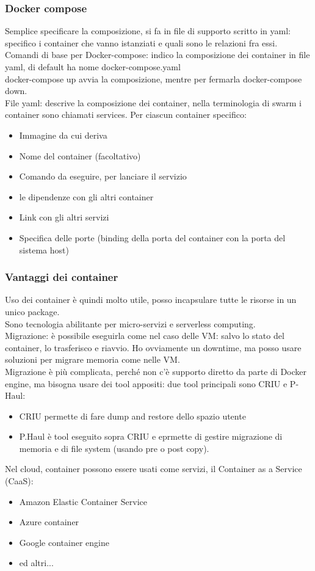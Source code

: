 \documentclass[16px]{article}
\begin{document}
\subsubsection{Docker compose}
Semplice specificare la composizione, si fa in file di supporto scritto in yaml: specifico i container che vanno istanziati e quali sono le relazioni fra essi.\\  
Comandi di base per Docker-compose: indico la composizione dei container in file yaml, di default ha nome docker-compose.yaml\\ docker-compose up avvia la composizione, mentre per fermarla docker-compose down.\\ File yaml: descrive la composizione dei container, nella terminologia di swarm i container sono chiamati services. Per ciascun container specifico:
\begin{itemize}
\item Immagine da cui deriva
\item Nome del container (facoltativo)
\item Comando da eseguire, per lanciare il servizio
\item le dipendenze con gli altri container
\item Link con gli altri servizi
\item Specifica delle porte (binding della porta del container con la porta del sistema host)
\end{itemize}
\subsubsection{Vantaggi dei container}
Uso dei container è quindi molto utile, posso incapsulare tutte le risorse in un unico package.\\ Sono tecnologia abilitante per micro-servizi e serverless computing.\\
Migrazione: è possibile eseguirla come nel caso delle VM: salvo lo stato del container, lo trasferisco e riavvio. Ho ovviamente un downtime, ma posso usare soluzioni per migrare memoria come nelle VM.\\ Migrazione è più complicata, perché non c'è supporto diretto da parte di Docker engine, ma bisogna usare dei tool appositi: due tool principali sono CRIU e P-Haul:
\begin{itemize}
\item CRIU permette di fare dump and restore dello spazio utente
\item P.Haul è tool eseguito sopra CRIU e eprmette di gestire migrazione di memoria e di file system (usando pre o post copy).
\end{itemize}
Nel cloud, container possono essere usati come servizi, il Container as a Service (CaaS):
\begin{itemize}
\item Amazon Elastic Container Service
\item Azure container
\item Google container engine
\item ed altri...
\end{itemize}
\end{document}
